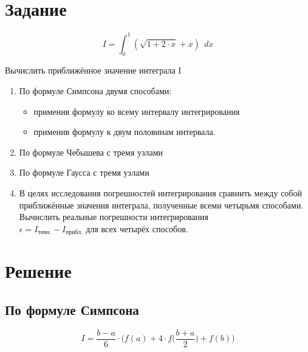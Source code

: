 





\section{Задание}

\begin{displaymath}
I = \int_{0}^{1} (\sqrt{1 + 2 \cdot x} + x)\ \ dx
\end{displaymath}

Вычислить приближённое значение интеграла I

\begin{enumerate}

\item По формуле Симпсона двумя способами:

\begin{itemize}

\item применив формулу ко всему интервалу интегрирования

\item применив формулу к двум половинам интервала.

\end{itemize}

\item По формуле Чебышева с тремя узлами

\item По формуле Гаусса с тремя узлами

\item В целях исследования погрешностей интегрирования сравнить между собой приближённые значения интеграла, полученные всеми четырьмя способами. Вычислить реальные погрешности интегрирования \\ $\epsilon = I_\text{точн.} - I_\text{прибл.}$ для всех четырёх способов.

\end{enumerate}

\section{Решение}

\subsection{По формуле Симпсона}

\begin{displaymath}
I = \frac{b - a}{6} \cdot \Big ( f(a) + 4 \cdot f \Big (\frac{b+a}{2} \Big ) + f(b) \Big )
\end{displaymath}

